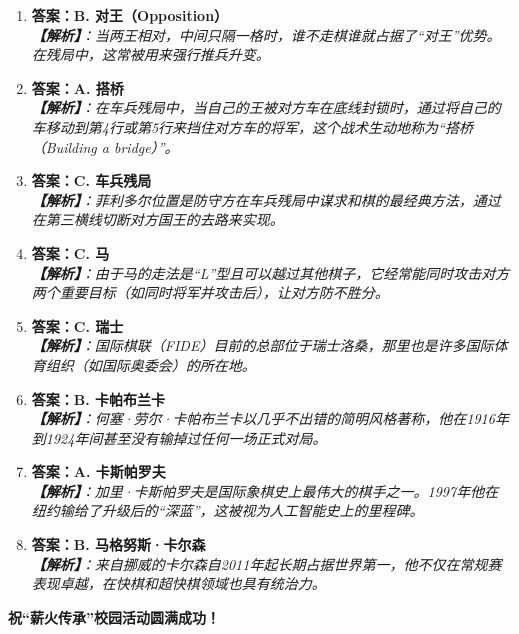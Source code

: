\documentclass[a4paper, 11pt]{ctexart}
\begin{document}
\begin{enumerate}[label=\arabic*., itemsep=1.5em]
    \item \textbf{答案：B. 对王（Opposition）} \\
    \textit{\textbf{【解析】}：当两王相对，中间只隔一格时，谁不走棋谁就占据了“对王”优势。在残局中，这常被用来强行推兵升变。}

    \item \textbf{答案：A. 搭桥} \\
    \textit{\textbf{【解析】}：在车兵残局中，当自己的王被对方车在底线封锁时，通过将自己的车移动到第4行或第5行来挡住对方车的将军，这个战术生动地称为“搭桥（Building a bridge）”。}

    \item \textbf{答案：C. 车兵残局} \\
    \textit{\textbf{【解析】}：菲利多尔位置是防守方在车兵残局中谋求和棋的最经典方法，通过在第三横线切断对方国王的去路来实现。}

    \item \textbf{答案：C. 马} \\
    \textit{\textbf{【解析】}：由于马的走法是“L”型且可以越过其他棋子，它经常能同时攻击对方两个重要目标（如同时将军并攻击后），让对方防不胜分。}

    \item \textbf{答案：C. 瑞士} \\
    \textit{\textbf{【解析】}：国际棋联（FIDE）目前的总部位于瑞士洛桑，那里也是许多国际体育组织（如国际奥委会）的所在地。}

    \item \textbf{答案：B. 卡帕布兰卡} \\
    \textit{\textbf{【解析】}：何塞·劳尔·卡帕布兰卡以几乎不出错的简明风格著称，他在1916年到1924年间甚至没有输掉过任何一场正式对局。}

    \item \textbf{答案：A. 卡斯帕罗夫} \\
    \textit{\textbf{【解析】}：加里·卡斯帕罗夫是国际象棋史上最伟大的棋手之一。1997年他在纽约输给了升级后的“深蓝”，这被视为人工智能史上的里程碑。}

    \item \textbf{答案：B. 马格努斯·卡尔森} \\
    \textit{\textbf{【解析】}：来自挪威的卡尔森自2011年起长期占据世界第一，他不仅在常规赛表现卓越，在快棋和超快棋领域也具有统治力。}
\end{enumerate}

\vspace{2em}
\begin{center}
    \textbf{祝“薪火传承”校园活动圆满成功！}
\end{center}
\end{document}
